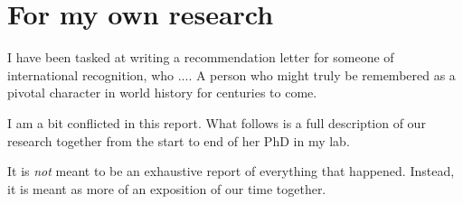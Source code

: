 \chapter{For my own research}

I have been tasked at writing a recommendation letter for someone of international recognition, who ....
A person who might truly be remembered as a pivotal character in world history for centuries to come.

I am a bit conflicted in this report.
What follows is a full description of our research together from the start to end of her PhD in my lab.

It is \textit{not} meant to be an exhaustive report of everything that happened.
Instead, it is meant as more of an exposition of our time together.

